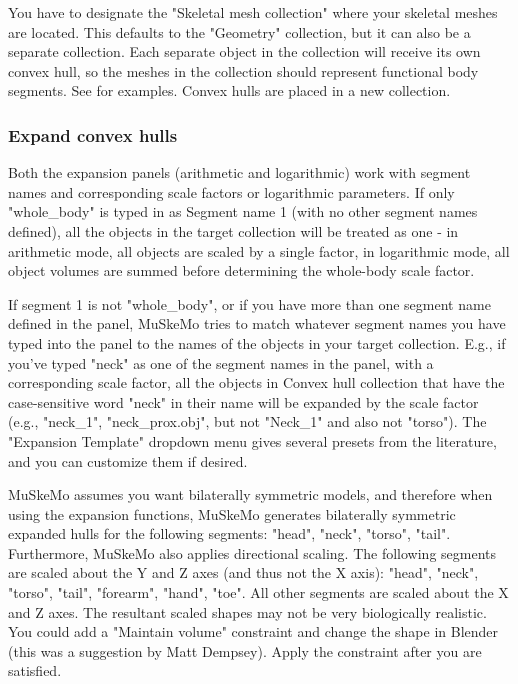 \documentclass{article}
\begin{document}
You have to designate the "Skeletal mesh collection" where your skeletal meshes are located. This defaults to the "Geometry" collection, but it can also be a separate collection. Each separate object in the collection will receive its own convex hull,
 so the meshes in the collection should represent functional body segments. See \cite{sellersMinimumConvexHull2012a,coathamConvexHullEstimation2021, macaulayDecouplingBodyShape2023} for examples. Convex hulls are placed in a new collection.


\subsubsection{Expand convex hulls} 

Both the expansion panels (arithmetic and logarithmic) work with segment names and corresponding scale factors or logarithmic parameters. If only "whole\_body" is typed in as Segment name 1 (with no other segment names defined), all the objects in the target collection will be treated as one - in arithmetic mode, all objects are scaled by a single factor, in logarithmic mode, all object volumes are summed before determining the whole-body scale factor. 

If segment 1 is not "whole\_body", or if you have more than one segment name defined in the panel, MuSkeMo tries to match whatever segment names you have typed into the panel to the names of the objects in your target collection. E.g., if you've typed "neck" as one of the segment names in the panel, with a corresponding scale factor, all the objects in Convex hull collection that have the case-sensitive word "neck" in their name will be expanded by the scale factor (e.g., "neck\_1", "neck\_prox.obj", but not "Neck\_1" and also not "torso"). The "Expansion Template" dropdown menu gives several presets from the literature, and you can customize them if desired.

MuSkeMo assumes you want bilaterally symmetric models, and therefore when using the expansion functions, MuSkeMo generates bilaterally symmetric expanded hulls for the following segments: "head", "neck", "torso", "tail". Furthermore, MuSkeMo also applies directional scaling. The following segments are scaled about the Y and Z axes (and thus not the X axis): "head", "neck", "torso", "tail", "forearm", "hand", "toe". All other segments are scaled about the X and Z axes. The resultant scaled shapes may not be very biologically realistic. You could add a "Maintain volume" constraint and change the shape in Blender (this was a suggestion by Matt Dempsey). Apply the constraint after you are satisfied.
\end{document}
